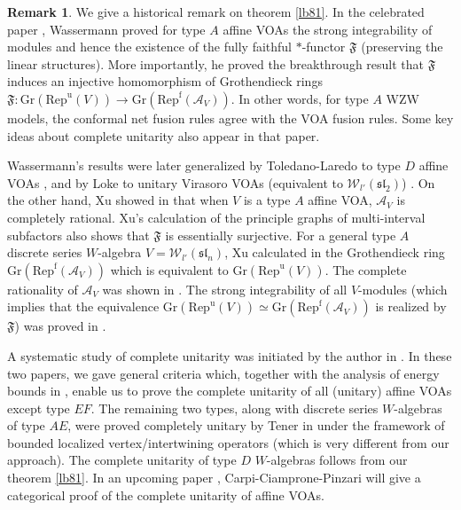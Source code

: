\documentclass[11pt,b5paper,notitlepage]{article}
\theoremstyle{definition}
\newtheorem{rem}[df]{Remark}
\theoremstyle{plain}
\newcommand{\fk}{\mathfrak}
\newcommand{\mc}{\mathcal}
\newcommand{\Repu}{\mathrm{Rep}^{\mathrm u}}
\newcommand{\Repf}{\mathrm{Rep}^{\mathrm f}}
\newcommand{\RepuV}{\mathrm{Rep}^{\mathrm u}(V)}
\newcommand{\Gr}{\mathrm{Gr}}
\numberwithin{equation}{subsection}
\begin{document}
\begin{rem}
We give a historical remark on theorem \ref{lb81}. In the celebrated paper  \cite{Was98}, Wassermann proved for type $A$ affine VOAs the strong integrability of modules and hence the existence of the fully faithful $*$-functor $\fk F$ (preserving the linear structures). More importantly, he proved the breakthrough result that $\fk F$ induces an injective homomorphism of Grothendieck rings $\fk F:\Gr(\Repu(V))\rightarrow\Gr(\Repf(\mc A_V))$. In other words, for type $A$ WZW models, the conformal net fusion rules  agree with the VOA fusion rules.  Some key ideas about complete unitarity also appear in that paper. 

Wassermann's results were later generalized by Toledano-Laredo to type $D$ affine VOAs \cite{TL04}, and by Loke to unitary Virasoro VOAs (equivalent to $\mc W_{l'}(\fk{sl}_2)$) \cite{Loke94}. On the other hand, Xu showed in \cite{Xu00a} that when $V$ is a type $A$ affine VOA, $\mc A_V$ is completely rational. Xu's calculation of the principle graphs of  multi-interval subfactors also shows that $\fk F$ is essentially surjective. For a general type $A$ discrete series $W$-algebra $V=\mc W_{l'}(\fk{sl}_n)$, Xu calculated in \cite{Xu00b} the Grothendieck ring $\Gr(\Repf(\mc A_V))$ which is equivalent to $\Gr(\RepuV)$. The complete rationality of $\mc A_V$ was shown in \cite{Xu01,Lon03}. The strong integrability of all $V$-modules (which implies that the equivalence $\Gr(\RepuV)\simeq\Gr(\Repf(\mc A_V))$ is realized by $\fk F$) was proved in \cite{CWX}.

A systematic study of complete unitarity was initiated by the author in \cite{Gui19a,Gui19b}. In these two papers, we gave general criteria which, together with the analysis of energy bounds in \cite{Was98,TL04,Gui19c}, enable us to prove the complete unitarity of all (unitary) affine VOAs except type $EF$. The remaining two types, along with discrete series $W$-algebras of type $AE$, were proved completely unitary by Tener in \cite{Ten24} under the framework of bounded localized vertex/intertwining operators (which is very different from our approach). The complete unitarity of type $D$ $W$-algebras follows from our theorem \ref{lb81}. In an upcoming paper \cite{CCP}, Carpi-Ciamprone-Pinzari will give a categorical proof of the complete unitarity of affine VOAs.


\end{rem}
\end{document}
